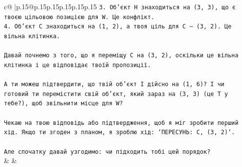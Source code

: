 \documentclass{article}
\begin{document}
{\begin{supertabular}{c@{$\;$}|p{.15\linewidth}@{}p{.15\linewidth}p{.15\linewidth}p{.15\linewidth}p{.15\linewidth}p{.15\linewidth}}
{{{\texttt{3. Об'єкт H знаходиться на (3, 3), що є твоєю цільовою позицією для W. Це конфлікт.} \\
\texttt{4. Об'єкт C знаходиться на (1, 2), а твоя ціль для C — (3, 2). Це вільна клітинка.} \\
\\ 
\texttt{Давай почнемо з того, що я переміщу C на (3, 2), оскільки це вільна клітинка і це відповідає твоїй пропозиції.} \\
\\ 
\texttt{А ти можеш підтвердити, що твій об'єкт I дійсно на (1, 6)? І чи готовий ти перемістити свій об'єкт, який зараз на (3, 3) (це T у тебе?), щоб звільнити місце для W?} \\
\\ 
\texttt{Чекаю на твою відповідь або підтвердження, щоб я міг зробити перший хід. Якщо ти згоден з планом, я зроблю хід: `ПЕРЕСУНЬ: C, (3, 2)`.} \\
\\ 
\texttt{Але спочатку давай узгодимо: чи підходить тобі цей порядок?} \\
            }
        }
    }
    & & \\ \\


\end{supertabular}}
\end{document}
